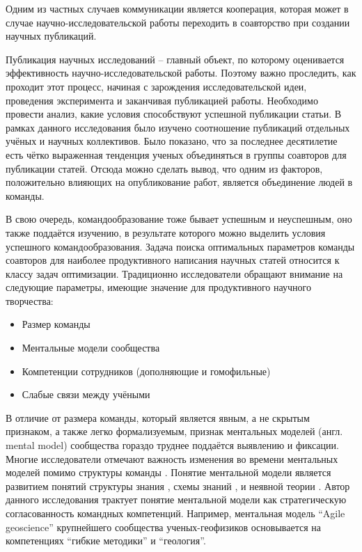 Одним из частных случаев коммуникации является кооперация, которая может в случае научно-исследовательской работы переходить 
в соавторство при создании научных публикаций. 

Публикация научных исследований – главный объект, по которому оценивается эффективность научно-исследовательской работы. 
Поэтому важно проследить, как проходит этот процесс, начиная с зарождения исследовательской идеи, проведения эксперимента и заканчивая публикацией работы. 
Необходимо провести анализ, какие условия способствуют успешной публикации статьи. 
В рамках данного исследования было изучено соотношение публикаций отдельных учёных и научных коллективов. Было показано, что за последнее десятилетие есть чётко выраженная тенденция ученых объединяться в группы соавторов для публикации статей. 
Отсюда можно сделать вывод, что одним из факторов, положительно влияющих на опубликование работ, является объединение людей в команды.

В свою очередь, командообразование тоже бывает успешным и неуспешным, оно также поддаётся изучению, в результате которого можно выделить условия успешного командообразования. 
Задача поиска оптимальных параметров команды соавторов для наиболее продуктивного написания научных статей относится к классу задач оптимизации. 
Традиционно исследователи обращают внимание на следующие параметры, имеющие значение для продуктивного научного творчества:
\begin{itemize}
\tightlist
\item Размер команды         
\item Ментальные модели сообщества
\item Компетенции сотрудников (дополняющие и гомофильные)
\item Слабые связи между учёными
\end{itemize}

В отличие от размера команды, который является явным, а не скрытым признаком, а также легко формализуемым, 
признак ментальных моделей (англ. mental model) сообщества гораздо труднее поддаётся выявлению и фиксации. 
Многие исследователи отмечают важность изменения во времени ментальных моделей помимо структуры команды \cite{klimoski1994team, morgeson1999structure}. 
Понятие ментальной модели является развитием понятий структуры знания \cite{walsh1995managerial}, схемы знаний \cite{fiske2013social, sims1986thinking}, и неявной теории \cite{brief1983cognitive}. 
Автор данного исследования трактует понятие ментальной модели как стратегическую согласованность командных компетенций. 
Например, ментальная модель ``Agile geoscience'' \cite{hall2011shale} крупнейшего сообщества ученых-геофизиков основывается на компетенциях ``гибкие методики'' и ``геология''.

